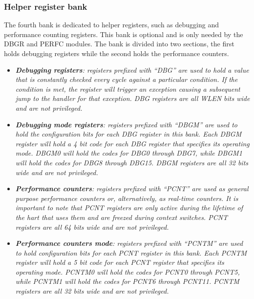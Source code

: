         \subsubsection{Helper register bank}

            \vspace{10pt}

            The fourth bank is dedicated to helper registers, such as debugging and performance counting registers. This bank is optional and is only needed by the DBGR and PERFC modules. The bank is divided into two sections, the first holds debugging registers while the second holds the performance counters.

            \begin{itemize}

                \item \textit{\textbf{Debugging registers}: registers prefixed with ``DBG'' are used to hold a value that is constantly checked every cycle against a particular condition. If the condition is met, the register will trigger an exception causing a subsequent jump to the handler for that exception. DBG registers are all WLEN bits wide and are not privileged.}

                \item \textit{\textbf{Debugging mode registers}: registers prefixed with ``DBGM'' are used to hold the configuration bits for each DBG register in this bank. Each DBGM register will hold a 4 bit code for each DBG register that specifies its operating mode. DBGM0 will hold the codes for DBG0 through DBG7, while DBGM1 will hold the codes for DBG8 through DBG15. DBGM registers are all 32 bits wide and are not privileged.}

                \item \textit{\textbf{Performance counters}: registers prefixed with ``PCNT'' are used as general purpose performance counters or, alternatively, as real-time counters. It is important to note that PCNT registers are only active during the lifetime of the hart that uses them and are freezed during context switches. PCNT registers are all 64 bits wide and are not privileged.}

                \item \textit{\textbf{Performance counters mode}: registers prefixed with ``PCNTM'' are used to hold configuration bits for each PCNT register in this bank. Each PCNTM register will hold a 5 bit code for each PCNT register that specifies its operating mode. PCNTM0 will hold the codes for PCNT0 through PCNT5, while PCNTM1 will hold the codes for PCNT6 through PCNT11. PCNTM registers are all 32 bits wide and are not privileged.}

            \end{itemize}

